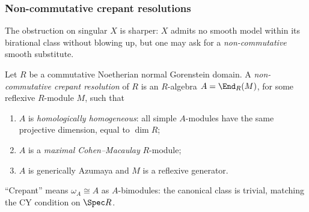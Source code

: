 \subsubsection{Non-commutative crepant resolutions}

The obstruction on singular $X$ is sharper: $X$ admits no smooth model within
its birational class without blowing up, but one may ask for a
\emph{non-commutative} smooth substitute.

\begin{definition}
\label{def:nccr}
Let $R$ be a commutative Noetherian normal Gorenstein
domain. A \emph{non-commutative crepant resolution} of $R$ is an $R$-algebra
$A = \End_R(M)$, for some reflexive $R$-module $M$, such that
\begin{enumerate}
\item[(N1)] $A$ is \emph{homologically homogeneous}: all simple $A$-modules have
the same projective dimension, equal to $\dim R$;
\item[(N2)] $A$ is a \emph{maximal Cohen--Macaulay} $R$-module;
\item[(N3)] $A$ is generically Azumaya and $M$ is a reflexive generator.
\end{enumerate}
\end{definition}

``Crepant'' means $\omega_A \cong A$ as $A$-bimodules: the canonical class is
trivial, matching the CY condition on $\Spec R$.

